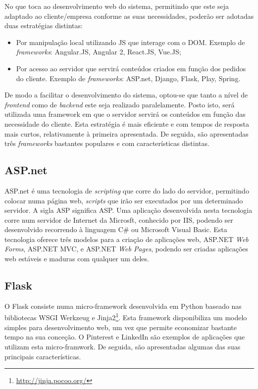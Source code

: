 No que toca ao desenvolvimento web do sistema, permitindo que este seja adaptado ao cliente/empresa conforme as suas necessidades, poderão ser adotadas duas estratégias distintas: 

\begin{itemize}
	\item Por manipulação local utilizando \ac{JS} que interage com o \ac{DOM}. Exemplo de \textit{frameworks}: Angular.JS, Angular 2, React.JS, Vue.JS; 
	
	\item Por acesso ao servidor que servirá conteúdos criados em função dos pedidos do cliente. Exemplo de \textit{frameworks}: ASP.net, Django, Flask, Play, Spring. 
	
\end{itemize}


De modo a facilitar o desenvolvimento do sistema, optou-se que tanto  a nível de \textit{frontend} como de \textit{backend} este seja realizado paralelamente. Posto isto, será utilizada uma framework em que o servidor servirá os conteúdos em função das necessidade do cliente. Esta estratégia é mais eficiente e com tempos de resposta mais curtos, relativamente à primeira apresentada. De seguida, são apresentadas três \textit{frameworks} bastantes populares e com características distintas. 




\subsection{ASP.net}


ASP.net é uma tecnologia de \textit{scripting} que corre do lado do servidor, permitindo colocar numa página web, \textit{scripts} que irão ser executados por um determinado servidor. A sigla \acs{ASP} significa \acl{ASP}. Uma aplicação desenvolvida nesta tecnologia corre num servidor de Internet da Microsft, conhecido por \ac{IIS}, podendo ser desenvolvido recorrendo à linguagem C\# ou Microsoft Visual Basic. Esta tecnologia oferece três modelos para a criação de aplicações web, ASP.NET \textit{Web Forms}, ASP.NET \ac{MVC}, e ASP.NET \textit{Web Pages}, podendo ser criadas aplicações web estáveis e maduras com qualquer um deles\cite{Microsoft2016}. 


\subsection{Flask}


O Flask consiste numa micro-framework desenvolvida em Python baseado nas bibliotecas \ac{WSGI} Werkzeug e Jinja2\footnote{\url{http://jinja.pocoo.org/}}. Esta framework disponibiliza um  modelo simples para desenvolvimento web, um vez que permite economizar bastante tempo na sua conceção. O Pinterest e LinkedIn são exemplos de aplicações que utilizam esta micro-framwork. De seguida, são apresentadas algumas das suas principais características\cite{Flask2014}. 


